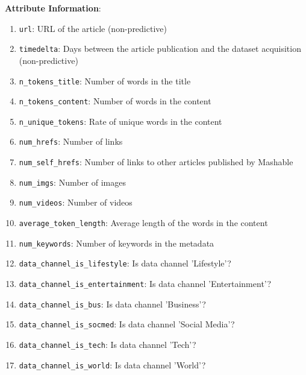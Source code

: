 \textbf{Attribute Information}:
\begin{enumerate}
\item \texttt{url}: URL of the article (non-predictive)
\item \texttt{timedelta}: Days between the article publication and the dataset acquisition (non-predictive) 
\item \texttt{n\_tokens\_title}: Number of words in the title 
\item \texttt{n\_tokens\_content}: Number of words in the content
\item \texttt{n\_unique\_tokens}: Rate of unique words in the content
\item \texttt{num\_hrefs}: Number of links 
\item \texttt{num\_self\_hrefs}: Number of links to other articles published by Mashable 
\item \texttt{num\_imgs}: Number of images  
\item \texttt{num\_videos}: Number of videos 
\item \texttt{average\_token\_length}: Average length of the words in the content
\item \texttt{num\_keywords}: Number of keywords in the metadata 
\item  \texttt{data\_channel\_is\_lifestyle}: Is data channel 'Lifestyle'? 
\item \texttt{data\_channel\_is\_entertainment}: Is data channel 'Entertainment'? 
\item \texttt{data\_channel\_is\_bus}: Is data channel 'Business'? 
\item \texttt{data\_channel\_is\_socmed}: Is data channel 'Social Media'? 
\item \texttt{data\_channel\_is\_tech}: Is data channel 'Tech'?  
\item \texttt{data\_channel\_is\_world}: Is data channel 'World'?


\end{enumerate}
